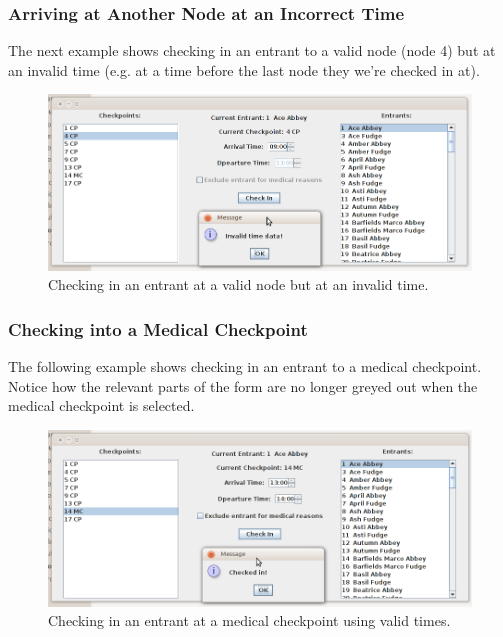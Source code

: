 \documentclass{article}
\begin{document}
\subsubsection{Arriving at Another Node at an Incorrect Time}
The next example shows checking in an entrant to a valid node (node 4) but at an invalid time (e.g. at a time before the last node they we're checked in at).

\begin{figure}[H]
\centering
\includegraphics[width=1\textwidth]{img/GUI-test/invalid-time.png}
\caption{Checking in an entrant at a valid node but at an invalid time.}
\label{fig:invalid-time}
\end{figure}

\subsubsection{Checking into a Medical Checkpoint}
The following example shows checking in an entrant to a medical checkpoint. Notice how the relevant parts of the form are no longer greyed out when the medical checkpoint is selected.

\begin{figure}[H]
\centering
\includegraphics[width=1\textwidth]{img/GUI-test/mc-checkin.png}
\caption{Checking in an entrant at a medical checkpoint using valid times.}
\label{fig:mc-checkin}
\end{figure}
\end{document}
